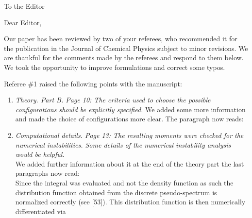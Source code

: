 \documentclass[DIN,pagenumber=false,parskip=half,fromalign=left,fromphone=true,fromemail=true,fromurl=false,fromlogo=false,fromrule=false]{scrlttr2}
\begin{document}
\begin{letter}{To the Editor}
	
	\opening{Dear Editor,}


Our paper has been reviewed by two of your referees,
who recommended it for the publication in the
Journal of Chemical Physics subject to minor revisions.
We are thankful for the comments made by the referees and
respond to them below. We took the opportunity to improve formulations
and correct some typos.

Referee \#1 raised the following points with the manuscript:

\begin{enumerate}
 \item \emph{Theory. Part B. Page 10: The criteria used to choose the
             \emph{possible configurations} should be explicitly specified.}
       We added some more information and made the choice of configurations more
       clear. The paragraph now reads:\\
       {}
 \item \emph{Computational details. Page 13: \emph{The resulting moments were
             checked for the numerical instabilities}. Some details of the
             numerical instability analysis would be helpful.}\\
       We added further information about it at the end of the theory part
       the last paragraphs now read:\\
       Since the integral was evaluated and not the density function as such
       the distribution function obtained from the
       discrete pseudo-spectrum is normalized correctly (see [53]).
       This distribution function is then numerically differentiated via
       

\end{enumerate}
\end{letter}
\end{document}
